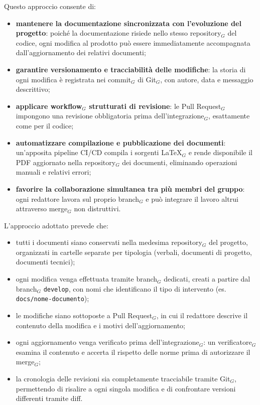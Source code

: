 \documentclass[a4paper, 10pt]{article}
\begin{document}
Questo approccio consente di:
\begin{itemize}
    \item \textbf{mantenere la documentazione sincronizzata con l'evoluzione del progetto}: poiché la documentazione risiede nello stesso repository$_G$ del codice, ogni modifica al prodotto può essere immediatamente accompagnata dall'aggiornamento dei relativi documenti;
    \item \textbf{garantire versionamento e tracciabilità delle modifiche}: la storia di ogni modifica è registrata nei commit$_G$ di Git$_G$, con autore, data e messaggio descrittivo;
    \item \textbf{applicare workflow$_G$ strutturati di revisione}: le Pull Request$_G$ impongono una revisione obbligatoria prima dell'integrazione$_G$, esattamente come per il codice;
    \item \textbf{automatizzare compilazione e pubblicazione dei documenti}: un'apposita pipeline CI/CD compila i sorgenti \LaTeX$_G$ e rende disponibile il PDF aggiornato nella repository$_G$ dei documenti, eliminando operazioni manuali e relativi errori;
    \item \textbf{favorire la collaborazione simultanea tra più membri del gruppo}: ogni redattore lavora sul proprio branch$_G$ e può integrare il lavoro altrui attraverso merge$_G$ non distruttivi.
\end{itemize}

L'approccio adottato prevede che:
\begin{itemize}
    \item tutti i documenti siano conservati nella medesima repository$_G$ del progetto, organizzati in cartelle separate per tipologia (verbali, documenti di progetto, documenti tecnici);
    \item ogni modifica venga effettuata tramite branch$_G$ dedicati, creati a partire dal branch$_G$ \texttt{develop}, con nomi che identificano il tipo di intervento (es. \texttt{docs/nome-documento});
    \item le modifiche siano sottoposte a Pull Request$_G$, in cui il redattore descrive il contenuto della modifica e i motivi dell'aggiornamento;
    \item ogni aggiornamento venga verificato prima dell'integrazione$_G$: un verificatore$_G$ esamina il contenuto e accerta il rispetto delle norme prima di autorizzare il merge$_G$;
    \item la cronologia delle revisioni sia completamente tracciabile tramite Git$_G$, permettendo di risalire a ogni singola modifica e di confrontare versioni differenti tramite diff.
\end{itemize}
\end{document}
